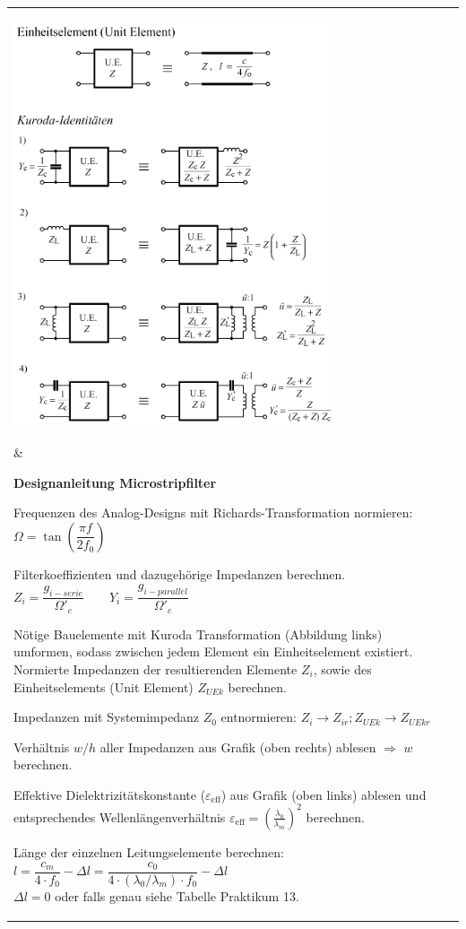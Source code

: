 \begin{tabular}{ll} 
	\parbox{9cm}{
		\includegraphics[width=9.5cm]{./bilder/components_filter_microstrip_kuroda.png}	
	 } 
	 & \parbox{9cm}{ 	 
		\textbf{Designanleitung Microstripfilter}
		\begin{aufzaehlung}
        	\item Frequenzen des Analog-Designs mit Richards-Transformation
        	normieren: $\Omega =\tan\left(\dfrac{\pi f}{2f_0}\right)$
        	\item Filterkoeffizienten und dazugehörige Impedanzen berechnen. 
        	$ Z_i = \dfrac{g_{i-serie}}{\Omega'_c} \qquad Y_i =
        	\dfrac{g_{i-parallel}}{\Omega'_c}$
        	\item Nötige Bauelemente mit Kuroda Transformation (Abbildung links)
        	umformen, sodass zwischen jedem Element ein Einheitselement existiert.
        	\\
        	Normierte Impedanzen der resultierenden Elemente $Z_{i}$, sowie des
        	Einheitselements (Unit Element) $Z_{UEk}$ berechnen.
        	\item Impedanzen mit Systemimpedanz $Z_0$ entnormieren: $Z_{i}
        	\rightarrow Z_{ir}; Z_{UEk} \rightarrow Z_{UEkr}$
        	\item Verhältnis $w/h$ aller Impedanzen aus Grafik (oben rechts)
        	ablesen $\Rightarrow$ $w$ berechnen.
        	\item Effektive Dielektrizitätskonstante ($\varepsilon_{{\text{eff}}}$) aus Grafik
        	(oben links) ablesen und entsprechendes Wellenlängenverhältnis        
        	$\varepsilon_{{\text{eff}}}=\left(\frac{\lambda_0}{\lambda_m}\right)^2$ 
        	berechnen.
        	\item Länge der einzelnen Leitungselemente berechnen: \\
        	$l = \dfrac{c_m}{4 \cdot f_0} - \Delta l = 
        	\dfrac{c_0}{4 \cdot (\lambda_0 / \lambda_m) \cdot f_0} - \Delta l $ \\
        	$\Delta l = 0$ oder falls genau siehe Tabelle Praktikum 13.
        \end{aufzaehlung}		
	}
\end{tabular}
